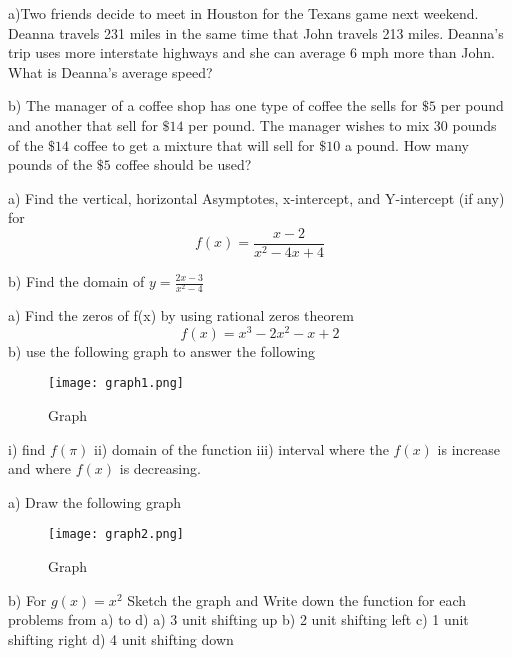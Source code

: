 \documentclass{exam}
\begin{document}
\begin{questions}
	\question  
	\subitem a)Two friends decide to meet in Houston for the Texans game next weekend.  Deanna travels 231 miles in the same time that John travels 213 miles. Deanna's trip uses more interstate highways and she can average 6 mph more than John. What is Deanna's average speed?
	\hfill\enspace\hrulefill 
	
	\subitem b) The manager of a coffee shop has one type of coffee the sells for $\$5$ per pound and another that sell for $\$14$ per pound. The manager wishes to mix 30 pounds of the $\$14$ coffee to get a mixture that will sell for $\$10$ a pound. How many pounds of the $\$5$ coffee should be used?
	
	
	
	
	
	\clearpage
	\question 
	\subitem a) Find the vertical, horizontal Asymptotes, x-intercept, and Y-intercept (if any) for  
	\hfill\enspace\hrulefill $$f(x)=\frac{x-2}{x^2-4x+4}$$
	 
	\subitem b) Find the domain of $y=\frac{2x-3}{x^2-4}$
	\hfill\enspace\hrulefill 
	
	\question 
	\subitem a) Find the zeros of f(x) by using rational zeros theorem 
	\hfill\enspace\hrulefill $$f(x)=x^3-2x^2-x+2$$
	 \vspace{7cm}
	 \subitem b) use the following graph to answer the following
	 \begin{figure}[http!]
	 	\centering
	 	\hspace*{0.9cm} \texttt{[image: graph1.png]}
	 	\caption{Graph}
	 \end{figure}
	 
	 
	 \subitem i) find $f(\pi)$
	 \subitem ii) domain of the function
	 \subitem iii) interval where the $f(x) $ is increase and where $f(x) $ is decreasing. 
	 
	 \clearpage
	 \question 
	 \subitem a) Draw the following graph
	 \begin{figure}[http!]
	 	\centering
	 	\hspace*{0.9cm} \texttt{[image: graph2.png]}
	 	\caption{Graph}
	 \end{figure}
	 \vspace{5cm}
	 
	
	 \subitem b) For \(g(x)=x^2\) Sketch the graph  and Write down the function for each problems from a) to d) 
	 \subitem a) 3 unit shifting up
	 \subitem b) 2 unit shifting left
	 \subitem c) 1 unit shifting right
	 \subitem d) 4 unit shifting down
	 

\end{questions}
\end{document}
